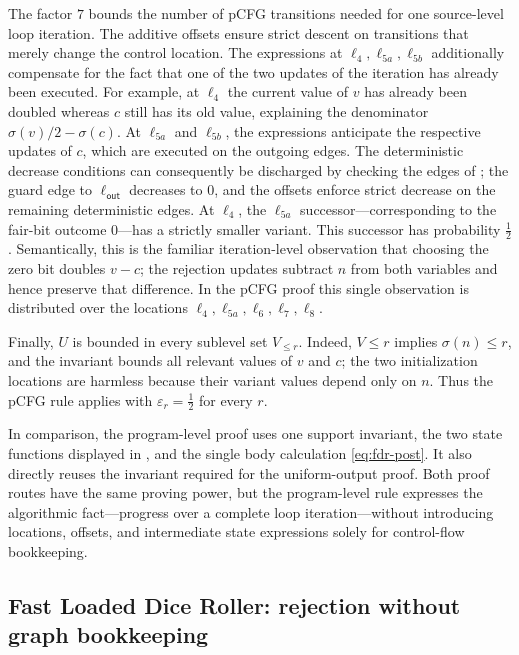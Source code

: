 The factor $7$ bounds the number of pCFG transitions needed for one source-level
loop iteration.  The additive offsets ensure strict descent on transitions
that merely change the control location.  The expressions at
$\ell_4,\ell_{5a},\ell_{5b}$ additionally compensate for the fact that one of
the two updates of the iteration has already been executed.  For example,
at $\ell_4$ the current value of $v$ has already been doubled whereas $c$
still has its old value, explaining the denominator
$\sigma(v)/2-\sigma(c)$.  At $\ell_{5a}$ and $\ell_{5b}$, the expressions anticipate the
respective updates of $c$, which are executed on the outgoing edges.
The deterministic decrease conditions can consequently be discharged by
checking the edges of ; the guard edge to
$\ell_{\mathsf{out}}$ decreases to $0$, and the offsets enforce strict
decrease on the remaining deterministic edges.  At $\ell_4$, the
$\ell_{5a}$ successor---corresponding to the fair-bit outcome $0$---has a
strictly smaller variant.  This successor has probability $\frac12$.
Semantically, this is the familiar iteration-level observation that choosing
the zero bit doubles $v-c$; the rejection updates subtract $n$ from both
variables and hence preserve that difference.  In the pCFG proof this single
observation is distributed over the locations
$\ell_4,\ell_{5a},\ell_6,\ell_7,\ell_8$.

Finally, $U$ is bounded in every sublevel set $V_{\leq r}$.  Indeed,
$V\leq r$ implies $\sigma(n)\leq r$, and the invariant bounds all relevant
values of $v$ and $c$; the two initialization locations are harmless because
their variant values depend only on $n$.  Thus the pCFG rule applies with
$\varepsilon_r=\frac12$ for every $r$.

In comparison, the program-level proof uses one support invariant, the two
state functions displayed in , and the single body calculation
\eqref{eq:fdr-post}.  It also directly reuses the invariant required for the
uniform-output proof.  Both proof routes have the same proving power, but the
program-level rule expresses the algorithmic fact---progress over a complete
loop iteration---without introducing locations, offsets, and intermediate
state expressions solely for control-flow bookkeeping.


\subsection{Fast Loaded Dice Roller: rejection without graph bookkeeping}
\label{sec:fldr}

